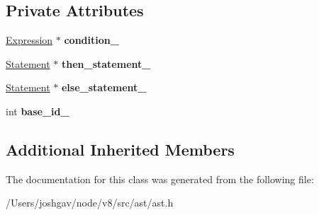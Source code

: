 \subsection*{Private Attributes}
\begin{DoxyCompactItemize}
\item 
\hyperlink{classv8_1_1internal_1_1_expression}{Expression} $\ast$ {\bfseries condition\+\_\+}\hypertarget{classv8_1_1internal_1_1_if_statement_a482735baba9ac20072fb5903025856f6}{}\label{classv8_1_1internal_1_1_if_statement_a482735baba9ac20072fb5903025856f6}

\item 
\hyperlink{classv8_1_1internal_1_1_statement}{Statement} $\ast$ {\bfseries then\+\_\+statement\+\_\+}\hypertarget{classv8_1_1internal_1_1_if_statement_ac231db5e6359174058a12e8de36df56f}{}\label{classv8_1_1internal_1_1_if_statement_ac231db5e6359174058a12e8de36df56f}

\item 
\hyperlink{classv8_1_1internal_1_1_statement}{Statement} $\ast$ {\bfseries else\+\_\+statement\+\_\+}\hypertarget{classv8_1_1internal_1_1_if_statement_a209d0e02743b6722506ad1037cbcd525}{}\label{classv8_1_1internal_1_1_if_statement_a209d0e02743b6722506ad1037cbcd525}

\item 
int {\bfseries base\+\_\+id\+\_\+}\hypertarget{classv8_1_1internal_1_1_if_statement_afb78131a558fba8da29a2fbb2aa0868c}{}\label{classv8_1_1internal_1_1_if_statement_afb78131a558fba8da29a2fbb2aa0868c}

\end{DoxyCompactItemize}
\subsection*{Additional Inherited Members}


The documentation for this class was generated from the following file\+:\begin{DoxyCompactItemize}
\item 
/\+Users/joshgav/node/v8/src/ast/ast.\+h\end{DoxyCompactItemize}

